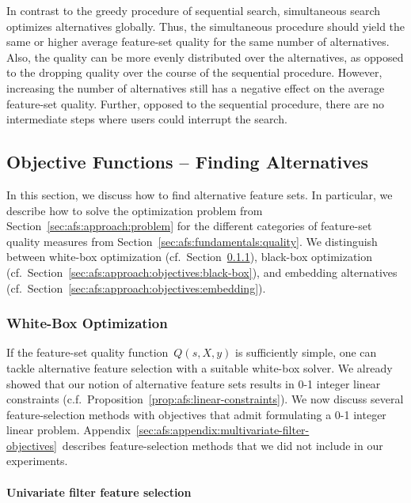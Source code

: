 \documentclass{article}
\theoremstyle{definition}
\begin{document}
In contrast to the greedy procedure of sequential search, simultaneous search optimizes alternatives globally.
Thus, the simultaneous procedure should yield the same or higher average feature-set quality for the same number of alternatives.
Also, the quality can be more evenly distributed over the alternatives, as opposed to the dropping quality over the course of the sequential procedure.
However, increasing the number of alternatives still has a negative effect on the average feature-set quality.
Further, opposed to the sequential procedure, there are no intermediate steps where users could interrupt the search.

\subsection{Objective Functions -- Finding Alternatives}
\label{sec:afs:approach:objectives}

In this section, we discuss how to find alternative feature sets.
In particular, we describe how to solve the optimization problem from Section~\ref{sec:afs:approach:problem} for the different categories of feature-set quality measures from Section~\ref{sec:afs:fundamentals:quality}.
We distinguish between white-box optimization (cf.~Section~\ref{sec:afs:approach:objectives:white-box}), black-box optimization (cf.~Section~\ref{sec:afs:approach:objectives:black-box}), and embedding alternatives (cf.~Section~\ref{sec:afs:approach:objectives:embedding}).

\subsubsection{White-Box Optimization}
\label{sec:afs:approach:objectives:white-box}

If the feature-set quality function~$Q(s,X,y)$ is sufficiently simple, one can tackle alternative feature selection with a suitable white-box solver.
We already showed that our notion of alternative feature sets results in 0-1 integer linear constraints (c.f.~Proposition~\ref{prop:afs:linear-constraints}).
We now discuss several feature-selection methods with objectives that admit formulating a 0-1 integer linear problem.
Appendix~\ref{sec:afs:appendix:multivariate-filter-objectives}~describes feature-selection methods that we did not include in our experiments.

\paragraph{Univariate filter feature selection}
\end{document}
